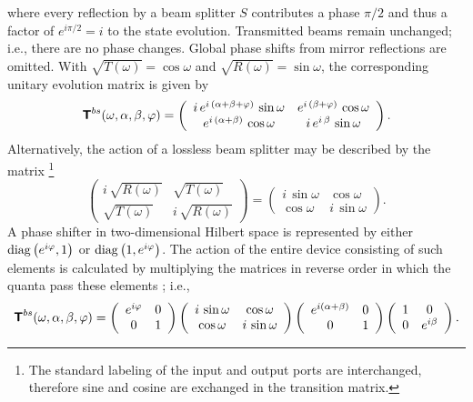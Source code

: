 \documentclass[prl,amsfonts,amsmath,showpacs,showkeys,preprint]{revtex4}
\begin{document}
where
every reflection by a beam splitter $S$ contributes a phase $\pi /2$
and thus a factor of $e^{i\pi /2}=i$ to the state evolution.
Transmitted beams remain unchanged; i.e., there are no phase changes.
Global phase shifts from mirror reflections are omitted.
With
$\sqrt{T(\omega )}=\cos \omega$
and
$\sqrt{R(\omega )}=\sin \omega$,
the corresponding unitary evolution matrix
is given by
\begin{equation}
{\textsf{\textbf{T}}}^{bs} (\omega ,\alpha ,\beta ,\varphi )=
\left(
\begin{array}{cc}
 i \,e^{i \,\left( \alpha + \beta + \varphi \right) }\,\sin \omega &
   e^{i \,\left( \beta + \varphi \right) }\,\cos \omega
\cr
   e^{i \,\left( \alpha + \beta \right) }\, \cos \omega&
i \,e^{i \,\beta}\,\sin \omega
 \end{array}
\right)
.
\label{e:quid1}
\end{equation}
Alternatively, the action of a lossless beam splitter may be
described by the matrix
\footnote{
The standard labeling of the input and output ports are interchanged,
therefore sine and cosine are exchanged in the transition matrix.}
$$
\left(
\begin{array}{cc}
i \, \sqrt{R(\omega )}& \sqrt{T(\omega )}
\\
\sqrt{T(\omega )}&  i\, \sqrt{R(\omega )}
 \end{array}
\right)
=
\left(
\begin{array}{cc}
i \, \sin \omega  & \cos \omega
\\
\cos \omega&  i\, \sin \omega
 \end{array}
\right)
.
$$
A phase shifter in two-dimensional Hilbert space is represented by
either
${\rm  diag}\left(
e^{i\varphi },1
\right)
$
or
${\rm  diag}
\left(
1,e^{i\varphi }
\right)
$.
 The action of the entire device consisting of such elements is
calculated by multiplying the matrices in reverse order in which the
quanta pass these elements \cite{yurke-86,teich:90}; i.e.,
\begin{equation}
{\textsf{\textbf{T}}}^{bs} (\omega ,\alpha ,\beta ,\varphi )=
\left(
\begin{array}{cc}
e^{i\varphi}& 0\\
0& 1
\end{array}
\right)
\left(
\begin{array}{cc}
i \, \sin \omega  & \cos \omega
\\
\cos \omega&  i\, \sin \omega
\end{array}
\right)
\left(
\begin{array}{cc}
e^{i(\alpha + \beta)}& 0\\
0& 1
\end{array}
\right)
\left(
\begin{array}{cc}
1&0\\
0& e^{i\beta }
\end{array}
\right).
\end{equation}
\end{document}
